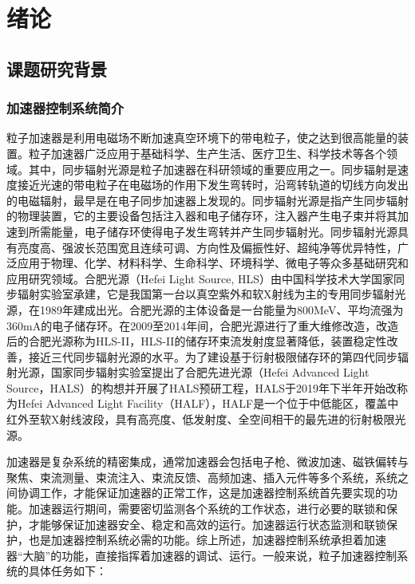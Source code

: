 
\chapter{绪论}

\section{课题研究背景}

\subsection{加速器控制系统简介}
粒子加速器是利用电磁场不断加速真空环境下的带电粒子，使之达到很高能量的装置。粒子加速器广泛应用于基础科学、生产生活、医疗卫生、科学技术等各个领域\cite{hong2014,Clayton2015}。其中，同步辐射光源是粒子加速器在科研领域的重要应用之一。同步辐射是速度接近光速的带电粒子在电磁场的作用下发生弯转时，沿弯转轨道的切线方向发出的电磁辐射，最早是在电子同步加速器上发现的。同步辐射光源是指产生同步辐射的物理装置，它的主要设备包括注入器和电子储存环，注入器产生电子束并将其加速到所需能量，电子储存环使得电子发生弯转并产生同步辐射光。同步辐射光源具有亮度高、强波长范围宽且连续可调、方向性及偏振性好、超纯净等优异特性，广泛应用于物理、化学、材料科学、生命科学、环境科学、微电子等众多基础研究和应用研究领域。合肥光源（Hefei Light Source, HLS）由中国科学技术大学国家同步辐射实验室承建，它是我国第一台以真空紫外和软X射线为主的专用同步辐射光源，在1989年建成出光。合肥光源的主体设备是一台能量为800MeV、平均流强为360mA的电子储存环。在2009至2014年间，合肥光源进行了重大维修改造，改造后的合肥光源称为HLS-II，HLS-II的储存环束流发射度显著降低，装置稳定性改善，接近三代同步辐射光源的水平\cite{Li2016}。为了建设基于衍射极限储存环的第四代同步辐射光源，国家同步辐射实验室提出了合肥先进光源（Hefei Advanced Light Source，HALS）的构想并开展了HALS预研工程，HALS于2019年下半年开始改称为Hefei Advanced Light Facility（HALF），HALF是一个位于中低能区，覆盖中红外至软X射线波段，具有高亮度、低发射度、全空间相干的最先进的衍射极限光源\cite{Bai2016}。

加速器是复杂系统的精密集成，通常加速器会包括电子枪、微波加速、磁铁偏转与聚焦、束流测量、束流注入、束流反馈、高频加速、插入元件等多个系统，系统之间协调工作，才能保证加速器的正常工作，这是加速器控制系统首先要实现的功能。加速器运行期间，需要密切监测各个系统的工作状态，进行必要的联锁和保护，才能够保证加速器安全、稳定和高效的运行。加速器运行状态监测和联锁保护，也是加速器控制系统必需的功能。综上所述，加速器控制系统承担着加速器“大脑”的功能，直接指挥着加速器的调试、运行。一般来说，粒子加速器控制系统的具体任务如下\cite{zhao2006,Liu2006}：

